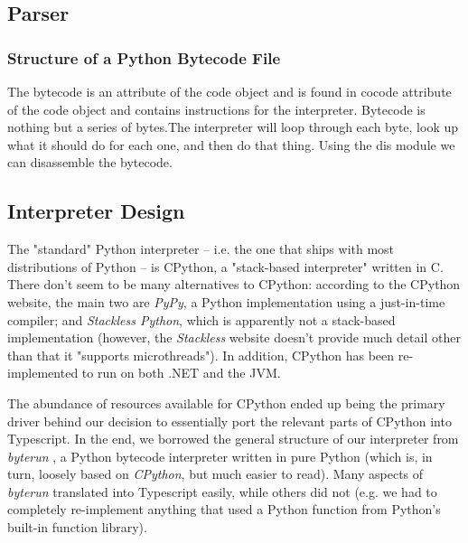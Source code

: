 \documentclass[10pt,a4paper]{article}
\begin{document}
\subsection{Parser}

\subsubsection{Structure of a Python Bytecode File}
The bytecode is an attribute of the code object and is found in cocode attribute of the code object and contains instructions for the interpreter. Bytecode is nothing but a series of bytes.The interpreter will loop through each byte, look up what it should do for each one, and then do that thing. Using the dis module we can disassemble the bytecode.



\subsection{Interpreter Design}
The "standard" Python interpreter -- i.e. the one that ships with most distributions of Python -- is CPython, a "stack-based interpreter" written in C. There don't seem to be many alternatives to CPython: according to the CPython website, the main two are \emph{PyPy}, a Python implementation using a just-in-time compiler; and \emph{Stackless Python}, which is apparently not a stack-based implementation (however, the \emph{Stackless} website doesn't provide much detail other than that it "supports microthreads"). In addition, CPython has been re-implemented to run on both .NET and the JVM. 

The abundance of resources available for CPython ended up being the primary driver behind our decision to essentially port the relevant parts of CPython into Typescript. In the end, we borrowed the general structure of our interpreter from \emph{byterun} \cite{byterun}, a Python bytecode interpreter written in pure Python (which is, in turn, loosely based on \emph{CPython}, but much easier to read). Many aspects of \emph{byterun} translated into Typescript easily, while others did not (e.g. we had to completely re-implement anything that used a Python function from Python's built-in function library).
\end{document}

